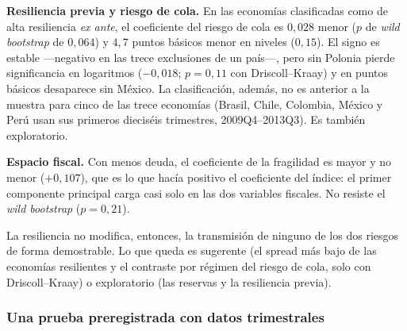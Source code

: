 \textbf{Resiliencia previa y riesgo de cola.} En las economías clasificadas como de alta resiliencia \textit{ex ante}, el coeficiente del riesgo de cola es $0{,}028$ menor ($p$ de \textit{wild bootstrap} de $0{,}064$) y $4{,}7$ puntos básicos menor en niveles ($0{,}15$). El signo es estable ---negativo en las trece exclusiones de un país---, pero sin Polonia pierde significancia en logaritmos ($-0{,}018$; $p=0{,}11$ con Driscoll--Kraay) y en puntos básicos desaparece sin México. La clasificación, además, no es anterior a la muestra para cinco de las trece economías (Brasil, Chile, Colombia, México y Perú usan sus primeros dieciséis trimestres, 2009Q4--2013Q3). Es también exploratorio.

\textbf{Espacio fiscal.} Con menos deuda, el coeficiente de la fragilidad es mayor y no menor ($+0{,}107$), que es lo que hacía positivo el coeficiente del índice: el primer componente principal carga casi solo en las dos variables fiscales. No resiste el \textit{wild bootstrap} ($p=0{,}21$).

La resiliencia no modifica, entonces, la transmisión de ninguno de los dos riesgos de forma demostrable. Lo que queda es sugerente (el spread más bajo de las economías resilientes y el contraste por régimen del riesgo de cola, solo con Driscoll--Kraay) o exploratorio (las reservas y la resiliencia previa).

\subsubsection{Una prueba preregistrada con datos trimestrales}
\label{sec:resiliencia-prereg}

